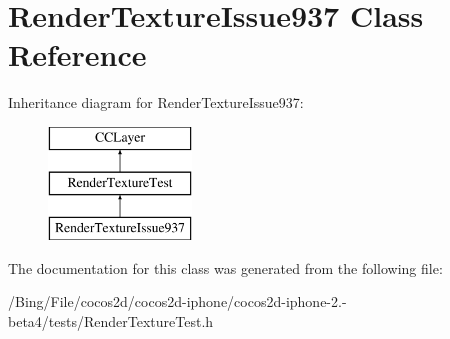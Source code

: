 \hypertarget{interface_render_texture_issue937}{\section{Render\-Texture\-Issue937 Class Reference}
\label{interface_render_texture_issue937}
}
Inheritance diagram for Render\-Texture\-Issue937\-:\begin{figure}[H]
\begin{center}
\leavevmode
\includegraphics[height=3.000000cm]{interface_render_texture_issue937}
\end{center}
\end{figure}


The documentation for this class was generated from the following file\-:\begin{DoxyCompactItemize}
\item 
/\-Bing/\-File/cocos2d/cocos2d-\/iphone/cocos2d-\/iphone-\/2.-\/beta4/tests/Render\-Texture\-Test.\-h\end{DoxyCompactItemize}
